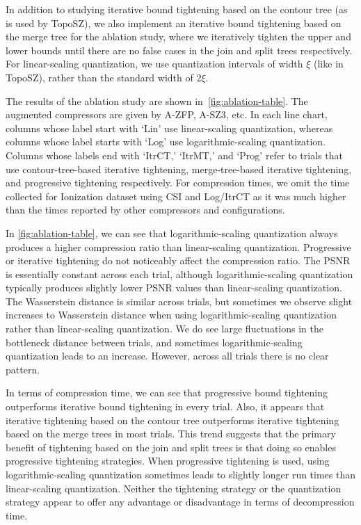 In addition to studying iterative bound tightening based on the contour tree (as is used by TopoSZ), we also implement an iterative bound tightening based on the merge tree for the ablation study, where we iteratively tighten the upper and lower bounds until there are no false cases in the join and split trees respectively. For linear-scaling quantization, we use quantization intervals of width $\xi$ (like in TopoSZ), rather than the standard width of $2\xi$.

The results of the ablation study are shown in~\cref{fig:ablation-table}. The augmented compressors are given by A-ZFP, A-SZ3, etc. In each line chart, columns whose label start with `Lin' use linear-scaling quantization, whereas columns whose label starts with `Log' use logarithmic-scaling quantization. Columns whose labels end with `ItrCT,' `ItrMT,' and `Prog' refer to trials that use contour-tree-based iterative tightening, merge-tree-based iterative tightening, and progressive tightening respectively. For compression times, we omit the time collected for Ionization dataset using CSI and Log/ItrCT as it was much higher than the times reported by other compressors and configurations.

In \cref{fig:ablation-table}, we can see that logarithmic-scaling quantization always produces a higher compression ratio than linear-scaling quantization. Progressive or iterative tightening do not noticeably affect the compression ratio. The PSNR is essentially constant across each trial, although logarithmic-scaling quantization typically produces slightly lower PSNR values than linear-scaling quantization. The Wasserstein distance is similar across trials, but sometimes we observe slight increases to Wasserstein distance when using logarithmic-scaling quantization rather than linear-scaling quantization. We do see large fluctuations in the bottleneck distance between trials, and sometimes logarithmic-scaling quantization leads to an increase. However, across all trials there is no clear pattern.

In terms of compression time, we can see that progressive bound tightening outperforms iterative bound tightening in every trial. Also, it appears that iterative tightening based on the contour tree outperforms iterative tightening based on the merge trees in most trials. This trend suggests that the primary benefit of tightening based on the join and split trees is that doing so enables progressive tightening strategies. When progressive tightening is used, using logarithmic-scaling quantization sometimes leads to slightly longer run times than linear-scaling quantization. Neither the tightening strategy or the quantization strategy appear to offer any advantage or disadvantage in terms of decompression time.

